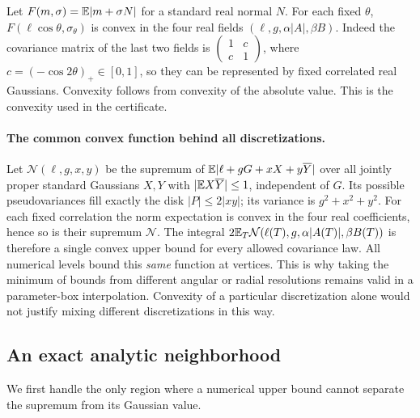 Let $F(m,\sigma)=\mathbb E|m+\sigma N|$ for a standard real normal $N$.
For each fixed $\theta$, $F(\ell\cos\theta,\sigma_\theta)$ is convex
in the four real fields $(\ell,g,\alpha|A|,\beta B)$. Indeed the
covariance matrix of the last two fields is
$\left(\begin{smallmatrix}1&c\\c&1\end{smallmatrix}\right)$,
where $c=(-\cos2\theta)_+\in[0,1]$, so they can be represented by fixed
correlated real Gaussians. Convexity follows from convexity of the
absolute value. This is the convexity used in the certificate.


\paragraph{The common convex function behind all discretizations.}
Let $\mathcal N(\ell,g,x,y)$ be the supremum of
$\mathbb E|\ell+gG+xX+y\overline Y|$ over all jointly proper standard
Gaussians $X,Y$ with $|\mathbb E X\overline Y|\le1$, independent of $G$.
Its possible pseudovariances fill exactly the disk $|P|\le2|xy|$;
its variance is $g^2+x^2+y^2$.
For each fixed correlation the norm expectation is convex in the four
real coefficients, hence so is their supremum $\mathcal N$.
The integral $2\mathbb E_T\mathcal N(\ell(T),g,\alpha|A(T)|,\beta B(T))$
is therefore a single convex upper bound for every allowed covariance
law. All numerical levels bound this \emph{same} function at vertices.
This is why taking the minimum of bounds from different angular or
radial resolutions remains valid in a parameter-box interpolation.
Convexity of a particular discretization alone would not justify
mixing different discretizations in this way.

\subsection{An exact analytic neighborhood}
We first handle the only region where a numerical upper bound cannot
separate the supremum from its Gaussian value.

